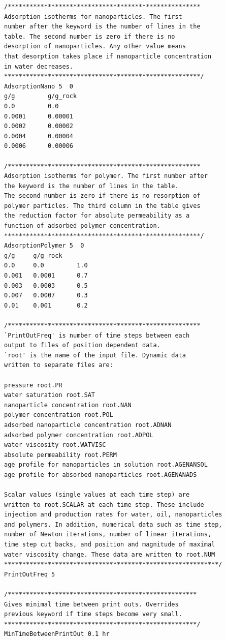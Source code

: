 \begin{appendices}
\begin{lstlisting}
/*****************************************************
Adsorption isotherms for nanoparticles. The first 
number after the keyword is the number of lines in the
table. The second number is zero if there is no 
desorption of nanoparticles. Any other value means
that desorption takes place if nanoparticle concentration
in water decreases.   
******************************************************/
AdsorptionNano 5  0
g/g     	g/g_rock
0.0     	0.0
0.0001  	0.00001
0.0002  	0.00002
0.0004  	0.00004
0.0006  	0.00006

/*****************************************************
Adsorption isotherms for polymer. The first number after
the keyword is the number of lines in the table.
The second number is zero if there is no resorption of 
polymer particles. The third column in the table gives 
the reduction factor for absolute permeability as a 
function of adsorbed polymer concentration.
******************************************************/ 
AdsorptionPolymer 5  0
g/g    	g/g_rock
0.0    	0.0      	1.0
0.001  	0.0001   	0.7
0.003  	0.0003   	0.5
0.007  	0.0007   	0.3
0.01   	0.001    	0.2

/*****************************************************
`PrintOutFreq' is number of time steps between each 
output to files of position dependent data. 
`root' is the name of the input file. Dynamic data 
written to separate files are:

pressure root.PR
water saturation root.SAT
nanoparticle concentration root.NAN 
polymer concentration root.POL
adsorbed nanoparticle concentration root.ADNAN 
adsorbed polymer concentration root.ADPOL
water viscosity root.WATVISC
absolute permeability root.PERM
age profile for nanoparticles in solution root.AGENANSOL
age profile for absorbed nanoparticles root.AGENANADS

Scalar values (single values at each time step) are 
written to root.SCALAR at each time step. These include
injection and production rates for water, oil, nanoparticles
and polymers. In addition, numerical data such as time step, 
number of Newton iterations, number of linear iterations, 
time step cut backs, and position and magnitude of maximal
water viscosity change. These data are written to root.NUM 
***********************************************************/
PrintOutFreq 5

/****************************************************
Gives minimal time between print outs. Overrides 
previous keyword if time steps become very small.
*****************************************************/
MinTimeBetweenPrintOut 0.1 hr


\end{lstlisting}
\end{appendices}
